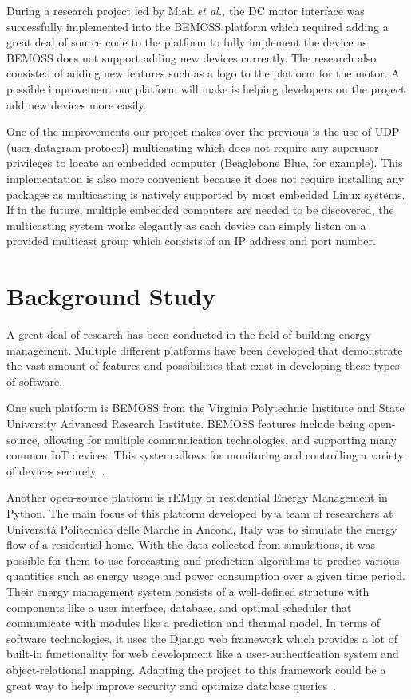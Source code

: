 During a research project led by Miah \textit{et al.,} the DC motor interface was successfully
implemented into the BEMOSS platform which required adding a great deal of source code
to the platform to fully implement the device as BEMOSS does not support adding
new devices currently. The research also consisted of adding new
features such as a logo to the
platform for the motor. A possible improvement our platform will make is helping
developers on the project add new devices more easily.

One of the improvements our project makes over the previous is the use of UDP (user datagram protocol) multicasting which does not require any superuser privileges to locate an
embedded computer (Beaglebone Blue, for example). This implementation is also more convenient
because it does not require installing any packages as multicasting is natively
supported by most embedded Linux systems. If in the future, multiple embedded
computers are needed to be discovered, the multicasting system works elegantly
as each device can simply listen on a provided multicast group which consists of
an IP address and port number.

\section{Background Study}
A great deal of research has been conducted in the field of building energy management. Multiple different platforms have been developed that demonstrate the vast amount of features and possibilities that exist in developing these types of software.

One such platform is BEMOSS from the Virginia Polytechnic Institute and State
University Advanced Research Institute. BEMOSS features include being
open-source, allowing for multiple communication technologies, and supporting
many common IoT devices. This system allows for monitoring and controlling a
variety of devices securely~\cite{BEMOSS}.

Another open-source platform is rEMpy or residential Energy Management in
Python. The main focus of this platform developed by a team of researchers at
Universit\`{a} Politecnica delle Marche in Ancona, Italy was to simulate the
energy flow of a residential home. With the data collected from simulations, it
was possible for them to use forecasting and prediction algorithms to predict
various quantities such as energy usage and power consumption over a given time period. Their energy management system consists of a well-defined structure with components like a user interface, database, and optimal scheduler that communicate with modules like a prediction and thermal model. In terms of software technologies, it uses the Django web framework which provides a lot of built-in functionality for web development like a user-authentication system and object-relational mapping. Adapting the project to this framework could be a great way to help improve security and optimize database queries~\cite{fagiani2017}.

